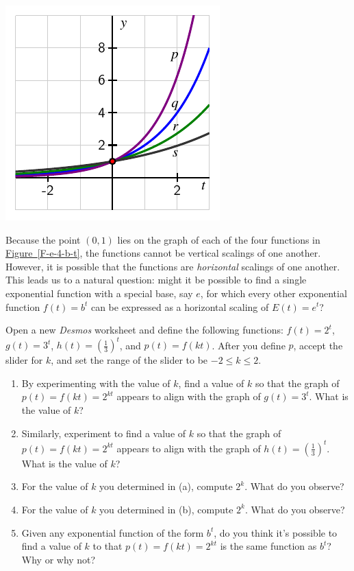 \documentclass[nooutcomes]{ximera}
\begin{document}
\begin{image}
\includegraphics{e-base-compression}
\end{image}
Because the point \((0,1)\) lies on the graph of each of the four functions in \hyperref[F-e-4-b-t]{Figure~\ref{F-e-4-b-t}}, the functions cannot be vertical scalings of one another.  However, it is possible that the functions are \emph{horizontal} scalings of one another.  This leads us to a natural question:  might it be possible to find a single exponential function with a special base, say \(e\), for which every other exponential function \(f(t) = b^t\) can be expressed as a horizontal scaling of \(E(t) = e^t\)?

\begin{exploration}
Open a new \emph{Desmos} worksheet and define the following functions: \(f(t) = 2^t\), \(g(t) = 3^t\), \(h(t) = \left(\frac{1}{3}\right)^t\), and \(p(t) = f(kt)\).  After you define \(p\), accept the slider for \(k\), and set the range of the slider to be \(-2 \le k \le 2\).
\begin{enumerate}[label=\alph*.]
\item By experimenting with the value of \(k\), find a value of \(k\) so that the graph of \(p(t) = f(kt) = 2^{kt}\) appears to align with the graph of \(g(t) = 3^t\).   What is the value of \(k\)?
\item Similarly, experiment to find a value of \(k\) so that the graph of \(p(t) = f(kt) = 2^{kt}\) appears to align with the graph of \(h(t) = (\frac{1}{3})^t\).   What is the value of \(k\)?
\item For the value of \(k\) you determined in (a), compute \(2^k\).  What do you observe?
\item For the value of \(k\) you determined in (b), compute \(2^k\).  What do you observe?
\item Given any exponential function of the form \(b^t\), do you think it's possible to find a value of \(k\) to that \(p(t) = f(kt) = 2^{kt}\) is the same function as \(b^t\)?  Why or why not?
\end{enumerate}

\end{exploration}
\end{document}
